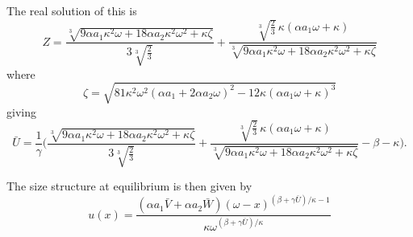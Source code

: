 \documentclass{article}
\begin{document}
The real solution of this is
\begin{equation}
  Z = \frac{ \sqrt[3]{9 \alpha a_1 \kappa^2 \omega+18 \alpha a_2 \kappa^2 \omega^2+\kappa\zeta}}{3 \sqrt[3]{\frac23}} +  
  \frac{\sqrt[3]{\frac23}\,\kappa (\alpha a_1  \omega+\kappa)}{\sqrt[3]{9 \alpha a_1 \kappa^2 \omega+18 \alpha a_2 \kappa^2 \omega^2+\kappa\zeta}}
\end{equation}  
where
\begin{equation}
\zeta= \sqrt{ 81 \kappa^2 \omega^2 (\alpha a_1 +2 \alpha a_2 \omega)^2 - 12\kappa( \alpha a_1  \omega+ \kappa)^3}
\end{equation}  
giving
\begin{equation}
  \bar{U} = \frac{1}{\gamma}\bigg(\frac{ \sqrt[3]{9 \alpha a_1 \kappa^2 \omega+18 \alpha a_2 \kappa^2 \omega^2+\kappa\zeta}}{3 \sqrt[3]{\frac23}} +  
  \frac{\sqrt[3]{\frac23}\,\kappa (\alpha a_1  \omega+\kappa)}{\sqrt[3]{9 \alpha a_1 \kappa^2 \omega+18 \alpha a_2 \kappa^2 \omega^2+\kappa\zeta}} - \beta - \kappa\bigg).
\end{equation}  

The size structure at equilibrium is then given by
\begin{equation}\label{eq:equi}
  u(x)  = \frac{\left(\alpha a_1 \bar{V} + \alpha a_2 \bar{W}\right) (\omega-x)^{(\beta+\gamma\bar{U})/\kappa-1}}{\kappa \omega^{(\beta+\gamma\bar{U})/\kappa}}
\end{equation}
\end{document}
